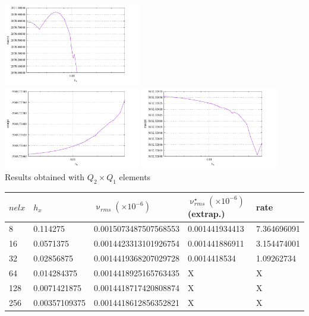 \begin{center}
\includegraphics[width=6cm]{python_codes/fieldstone_25/results/max_v_001.pdf}\\
\includegraphics[width=6cm]{python_codes/fieldstone_25/results/min_p_001.pdf}
\includegraphics[width=6cm]{python_codes/fieldstone_25/results/max_p_001.pdf}\\
{\captionfont Results obtained with $Q_2\times Q_1$ elements} 
\end{center}

\begin{tabular}{lllll}
\hline
$nelx$ & $h_x$ & $\upnu_{rms}(\times 10^{-6})$ & $\upnu^\star_{rms}(\times 10^{-6})$ (extrap.)  & rate \\
\hline\hline
8    & 0.114275      & 0.0015073487507568553 &  0.001441934413 & 7.364696091 \\
16   & 0.0571375     & 0.0014423313101926754 &  0.001441886911 & 3.154474001 \\
32   & 0.02856875    & 0.0014419368207029728 &  0.0014418534   & 1.09262734 \\
64   & 0.014284375   & 0.0014418925165763435 &  X              & X   \\
128  & 0.0071421875  & 0.0014418717420808874 &  X              & X   \\
256  & 0.00357109375 & 0.0014418612856352821 &  X              & X   \\
\hline
\end{tabular}















